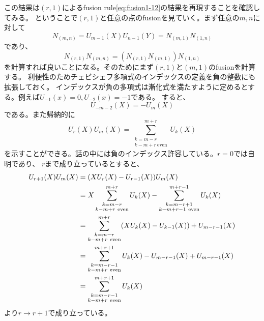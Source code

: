 \documentclass[11pt, aps, longbibliography]{article}
\numberwithin{equation}{section}
\begin{document}
        この結果は$(r,1)$によるfusion rule\eqref{eq:fusion1-12}の結果を再現することを確認してみる。
        ということで$(r,1)$と任意の点のfusionを見ていく。まず任意の$m,n$に対して
        \begin{equation}\label{eq:fusion3-21}
            N_{(m,n)} = U_{m-1}(X)U_{n-1}(Y) = N_{(m,1)}N_{(1,n)}
        \end{equation}
        であり、
        \begin{equation}\label{eq:fusion3-22}
            N_{(r,1)}N_{(m,n)} = (N_{(r,1)}N_{(m,1)})N_{(1,n)}
        \end{equation}
        を計算すれば良いことになる。そのためにまず$(r,1)$と$(m,1)$のfusionを計算する。
        利便性のためチェビシェフ多項式のインデックスの定義を負の整数にも拡張しておく。
        インデックスが負の多項式は漸化式を満たすように定めるとする。例えば$U_{-1}(x)=0,U_{-2}(x)=-1$である。
        すると、
        \begin{equation}\label{eq:fusion3-23}
            U_{-m-2}(X) = -U_m(X)
        \end{equation}
        である。また帰納的に
        \begin{equation}\label{eq:fusion3-24}
            U_r(X)U_m(X) = \sum_{\substack{k=m-r \\ k-m+r \ \text{even}}}^{m+r} U_k(X)
        \end{equation}
        を示すことができる。話の中には負のインデックス許容している。$r=0$では自明であり、
        $r$まで成り立っているとすると、
        \begin{align}\label{eq:fusion3-25}
            U_{r+1}(X)U_m(X) &= (XU_r(X) - U_{r-1}(X))U_m(X) \notag \\
            &= X\sum_{\substack{k=m-r \\ k-m+r \ \text{even}}}^{m+r} U_k(X) - \sum_{\substack{k=m-r+1 \\ k-m+r-1 \ \text{even}}}^{m+r-1} U_k(X) \notag \\
            &= \sum_{\substack{k=m-r \\ k-m+r \ \text{even}}}^{m+r} (XU_k(X)-U_{k-1}(X)) + U_{m-r-1}(X)\notag \\
            &= \sum_{\substack{k=m-r-1 \\ k-m+r \ \text{even}}}^{m+r+1} U_k(X) - U_{m-r-1}(X) + U_{m-r-1}(X) \notag \\
            &= \sum_{\substack{k=m-r-1 \\ k-m+r \ \text{even}}}^{m+r+1} U_k(X)
        \end{align}
        より$r\rightarrow r+1$で成り立っている。
\end{document}
